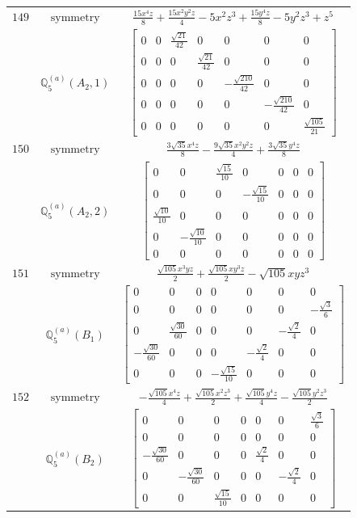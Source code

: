 \documentclass[fleqn,8pt,landscape]{jsarticle}
\begin{document}
\begin{longtable}{ccc}
$ 149 $ & $ \text{symmetry} $ & $ \frac{15 x^{4} z}{8} + \frac{15 x^{2} y^{2} z}{4} - 5 x^{2} z^{3} + \frac{15 y^{4} z}{8} - 5 y^{2} z^{3} + z^{5} $ \\
$  $ & $ \mathbb{Q}_{5}^{(a)}(A_{2},1) $ & $ \begin{bmatrix} 0 & 0 & \frac{\sqrt{21}}{42} & 0 & 0 & 0 & 0 \\ 0 & 0 & 0 & \frac{\sqrt{21}}{42} & 0 & 0 & 0 \\ 0 & 0 & 0 & 0 & - \frac{\sqrt{210}}{42} & 0 & 0 \\ 0 & 0 & 0 & 0 & 0 & - \frac{\sqrt{210}}{42} & 0 \\ 0 & 0 & 0 & 0 & 0 & 0 & \frac{\sqrt{105}}{21} \end{bmatrix} $ \\ \hline
$ 150 $ & $ \text{symmetry} $ & $ \frac{3 \sqrt{35} x^{4} z}{8} - \frac{9 \sqrt{35} x^{2} y^{2} z}{4} + \frac{3 \sqrt{35} y^{4} z}{8} $ \\
$  $ & $ \mathbb{Q}_{5}^{(a)}(A_{2},2) $ & $ \begin{bmatrix} 0 & 0 & \frac{\sqrt{15}}{10} & 0 & 0 & 0 & 0 \\ 0 & 0 & 0 & - \frac{\sqrt{15}}{10} & 0 & 0 & 0 \\ \frac{\sqrt{10}}{10} & 0 & 0 & 0 & 0 & 0 & 0 \\ 0 & - \frac{\sqrt{10}}{10} & 0 & 0 & 0 & 0 & 0 \\ 0 & 0 & 0 & 0 & 0 & 0 & 0 \end{bmatrix} $ \\ \hline
$ 151 $ & $ \text{symmetry} $ & $ \frac{\sqrt{105} x^{3} y z}{2} + \frac{\sqrt{105} x y^{3} z}{2} - \sqrt{105} x y z^{3} $ \\
$  $ & $ \mathbb{Q}_{5}^{(a)}(B_{1}) $ & $ \begin{bmatrix} 0 & 0 & 0 & 0 & 0 & 0 & 0 \\ 0 & 0 & 0 & 0 & 0 & 0 & - \frac{\sqrt{3}}{6} \\ 0 & \frac{\sqrt{30}}{60} & 0 & 0 & 0 & - \frac{\sqrt{2}}{4} & 0 \\ - \frac{\sqrt{30}}{60} & 0 & 0 & 0 & - \frac{\sqrt{2}}{4} & 0 & 0 \\ 0 & 0 & 0 & - \frac{\sqrt{15}}{10} & 0 & 0 & 0 \end{bmatrix} $ \\ \hline
$ 152 $ & $ \text{symmetry} $ & $ - \frac{\sqrt{105} x^{4} z}{4} + \frac{\sqrt{105} x^{2} z^{3}}{2} + \frac{\sqrt{105} y^{4} z}{4} - \frac{\sqrt{105} y^{2} z^{3}}{2} $ \\
$  $ & $ \mathbb{Q}_{5}^{(a)}(B_{2}) $ & $ \begin{bmatrix} 0 & 0 & 0 & 0 & 0 & 0 & \frac{\sqrt{3}}{6} \\ 0 & 0 & 0 & 0 & 0 & 0 & 0 \\ - \frac{\sqrt{30}}{60} & 0 & 0 & 0 & \frac{\sqrt{2}}{4} & 0 & 0 \\ 0 & - \frac{\sqrt{30}}{60} & 0 & 0 & 0 & - \frac{\sqrt{2}}{4} & 0 \\ 0 & 0 & \frac{\sqrt{15}}{10} & 0 & 0 & 0 & 0 \end{bmatrix} $ \\ \hline

\end{longtable}
\end{document}
